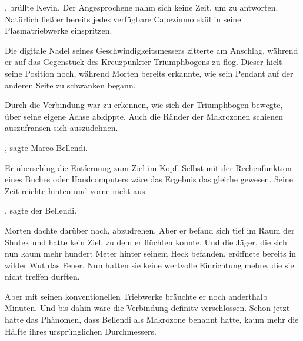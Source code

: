 , brüllte Kevin. Der Angesprochene nahm sich keine Zeit, um zu antworten. Natürlich ließ er bereits jedes verfügbare Capezinmolekül in seine Plasmatriebwerke einspritzen.

\par

Die digitale Nadel seines Geschwindigkeitsmessers zitterte am Anschlag, während er auf das Gegenstück des Kreuzpunkter Triumphbogens zu flog. Dieser hielt seine Position noch, während Morten bereits erkannte, wie sein Pendant auf der anderen Seite zu schwanken begann.

\par

Durch die Verbindung war zu erkennen, wie sich der Triumphbogen bewegte, über seine eigene Achse abkippte. Auch die Ränder der Makrozonen schienen auszufransen sich auszudehnen.

\par

, sagte Marco Bellendi. 

\par

Er überschlug die Entfernung zum Ziel im Kopf. Selbst mit der Rechenfunktion eines Buches oder Handcomputers wäre das Ergebnis das gleiche gewesen. Seine Zeit reichte hinten und vorne nicht aus.

\par

, sagte der Bellendi. 

\par

Morten dachte darüber nach, abzudrehen. Aber er befand sich tief im Raum der Shutek und hatte kein Ziel, zu dem er flüchten konnte. Und die Jäger, die sich nun kaum mehr hundert Meter hinter seinem Heck befanden, eröffnete bereits in wilder Wut das Feuer. Nun hatten sie keine wertvolle Einrichtung mehre, die sie nicht treffen durften.

\par

Aber mit seinen konventionellen Triebwerke bräuchte er noch anderthalb Minuten. Und bis dahin wäre die Verbindung definitv verschlossen. Schon jetzt hatte das Phänomen, dass Bellendi als Makrozone benannt hatte, kaum mehr die Hälfte ihres ursprünglichen Durchmessers.

